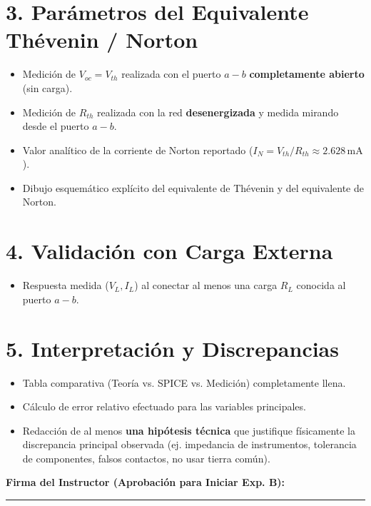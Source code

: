\documentclass[11pt, a4paper]{article}
\begin{document}
\section*{3. Parámetros del Equivalente Thévenin / Norton}
\begin{itemize}\setlength\itemsep{0.1em}
    \item[$\square$] Medición de $V_{oc} = V_{th}$ realizada con el puerto $a-b$ \textbf{completamente abierto} (sin carga).
    \item[$\square$] Medición de $R_{th}$ realizada con la red \textbf{desenergizada} y medida mirando desde el puerto $a-b$.
    \item[$\square$] Valor analítico de la corriente de Norton reportado ($I_N = V_{th}/R_{th} \approx 2.628\,\text{mA}$).
    \item[$\square$] Dibujo esquemático explícito del equivalente de Thévenin y del equivalente de Norton.
\end{itemize}

\section*{4. Validación con Carga Externa}
\begin{itemize}\setlength\itemsep{0.1em}
    \item[$\square$] Respuesta medida ($V_L, I_L$) al conectar al menos una carga $R_L$ conocida al puerto $a-b$.
\end{itemize}

\section*{5. Interpretación y Discrepancias}
\begin{itemize}\setlength\itemsep{0.1em}
    \item[$\square$] Tabla comparativa (Teoría vs. SPICE vs. Medición) completamente llena.
    \item[$\square$] Cálculo de error relativo efectuado para las variables principales.
    \item[$\square$] Redacción de al menos \textbf{una hipótesis técnica} que justifique físicamente la discrepancia principal observada (ej. impedancia de instrumentos, tolerancia de componentes, falsos contactos, no usar tierra común).
\end{itemize}

\vspace{0.5cm}
\begin{center}
    \textbf{Firma del Instructor (Aprobación para Iniciar Exp. B):} \rule{6cm}{0.4pt}
\end{center}
\end{document}
